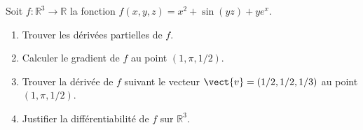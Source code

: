 \begin{exercice}\label{exoGeomAnal-0046}

Soit $f:\mathbb{R}^3\to \mathbb{R}$ la fonction $\displaystyle f(x,y,z)= x^2+\sin(yz)+ye^x.$
\begin{enumerate}
\item Trouver les dérivées partielles de $f$.
\item Calculer le gradient de $f$ au point $(1,\pi, 1/2)$.
\item Trouver la dérivée de $f$ suivant le vecteur $\vect{v}= (1/2, 1/2, 1/3)$ au point $(1,\pi, 1/2)$.
\item Justifier la différentiabilité de $f$ sur $\mathbb{R}^3$.
\end{enumerate}

\end{exercice}
